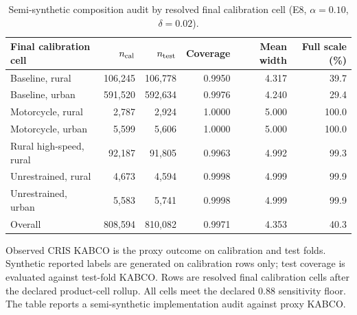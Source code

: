 \begin{table}[pos=htbp]
\caption{Semi-synthetic composition audit by resolved final calibration cell (E8, $\alpha=0.10$, $\delta=0.02$).}
\label{tbl:compose}
\centering\footnotesize
\begin{threeparttable}
\begin{tabular*}{\tblwidth}{@{\extracolsep{\fill}}lrrrrr@{}}
\toprule
Final calibration cell & $n_{\rm cal}$ & $n_{\rm test}$ & Coverage & Mean width & Full scale (\%) \\
\midrule
Baseline, rural & 106,245 & 106,778 & 0.9950 & 4.317 & 39.7 \\
Baseline, urban & 591,520 & 592,634 & 0.9976 & 4.240 & 29.4 \\
Motorcycle, rural & 2,787 & 2,924 & 1.0000 & 5.000 & 100.0 \\
Motorcycle, urban & 5,599 & 5,606 & 1.0000 & 5.000 & 100.0 \\
Rural high-speed, rural & 92,187 & 91,805 & 0.9963 & 4.992 & 99.3 \\
Unrestrained, rural & 4,673 & 4,594 & 0.9998 & 4.999 & 99.9 \\
Unrestrained, urban & 5,583 & 5,741 & 0.9998 & 4.999 & 99.9 \\
Overall & 808,594 & 810,082 & 0.9971 & 4.353 & 40.3 \\
\bottomrule
\end{tabular*}
\begin{tablenotes}\footnotesize
\item Observed CRIS KABCO is the proxy outcome on calibration and test folds. Synthetic reported labels are generated on calibration rows only; test coverage is evaluated against test-fold KABCO. Rows are resolved final calibration cells after the declared product-cell rollup. All cells meet the declared 0.88 sensitivity floor. The table reports a semi-synthetic implementation audit against proxy KABCO.
\end{tablenotes}
\end{threeparttable}
\end{table}
